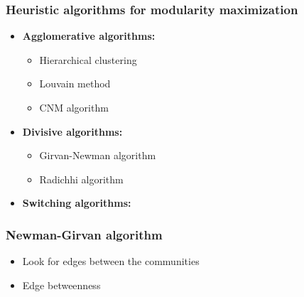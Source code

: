 \documentclass{beamer}
\begin{document}
\begin{frame}
    \frametitle{Heuristic algorithms for modularity maximization}
    \centering
    \begin{itemize}
        \setlength\itemsep{2em}
        \item{{\bf Agglomerative algorithms:}
            
    \begin{itemize}
        \setlength\itemsep{1em}
        \item{Hierarchical clustering}
        \item{Louvain method}
        \item{CNM algorithm}
    \end{itemize}
            
            }
        \item{{\bf Divisive algorithms:}
            
    \begin{itemize}
        \setlength\itemsep{1em}
        \item{Girvan-Newman algorithm}
        \item{Radichhi algorithm}
    \end{itemize}
            
            
            }

        \item{\bf Switching algorithms:}
    \end{itemize}
\end{frame}
\begin{frame}
    \frametitle{Newman-Girvan algorithm}
    \centering
    
    \begin{itemize}
        \setlength\itemsep{1em}
        \item{Look for edges between the communities}

        \item{Edge betweenness}
    \end{itemize}
\end{frame}
\end{document}
